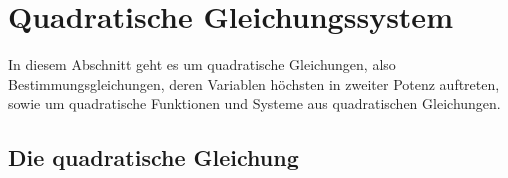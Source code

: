 
\thispagestyle{empty}
\section{Quadratische Gleichungssystem}

In diesem Abschnitt geht es um quadratische Gleichungen, also Bestimmungsgleichungen, deren Variablen höchsten in zweiter Potenz auftreten, sowie um quadratische Funktionen und Systeme aus quadratischen Gleichungen.

\subsection{Die quadratische Gleichung}
